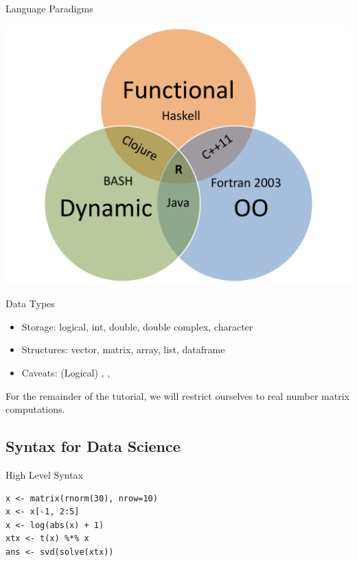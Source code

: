 \begin{frame}
  \begin{block}{Language Paradigms}\pause
  \begin{center}
    \includegraphics[scale=.35]{../common/pics/languages}
  \end{center}
  \end{block}
\end{frame}

\begin{frame}
  \begin{block}{Data Types}\pause
  \begin{itemize}[<+-|alert@+>]
    \item Storage:  logical, int, double, double complex, character
    \item Structures:  vector, matrix, array, list, dataframe
    \item Caveats:  (Logical) , , 
  \end{itemize}
  For the remainder of the tutorial, we will restrict ourselves to real number 
matrix computations.
\end{block}
\end{frame}




\subsection{Syntax for Data Science}


\begin{frame}[fragile]
\begin{block}{High Level Syntax}\pause
\begin{lstlisting}
x <- matrix(rnorm(30), nrow=10)
x <- x[-1, 2:5]
x <- log(abs(x) + 1)
xtx <- t(x) %*% x
ans <- svd(solve(xtx))
\end{lstlisting}
\end{block}
\end{frame}


